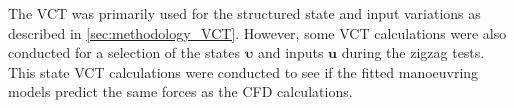 The VCT was primarily used for the structured state and input variations as described in \autoref{sec:methodology_VCT}. However, some VCT calculations were also conducted for a selection of the states $\pmb{\bm{\upsilon}}$ and inputs $\mathbf{u}$ during the zigzag tests. This state VCT calculations were conducted to see if the fitted manoeuvring models predict the same forces as the CFD calculations.
